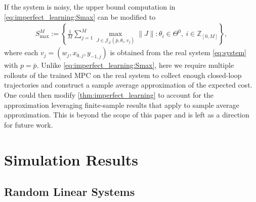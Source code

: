 \documentclass[journal,twoside,web,final]{ieeecolor}
\theoremstyle{definition}
\newcommand{\Z}{\mathbb{Z}}
\newcommand{\J}{\mathcal{J}}
\newcommand{\C}{\mathbb{C}}
\newcommand{\Cb}{{\bar{\mathcal{C}}}}
\begin{document}
If the system is noisy, the upper bound computation in \cref{eq:imperfect_learning:Smax} can be modified to
\begin{align*}
S_{\text{max}}^M := \left\{ \frac{1}{M} \sum_{j=1}^M \max_{J\in \J_\Cb(\bar{p},\theta_i,v_j)} \|J\| : \theta_i \in \Theta^0, ~ i\in\Z_{[0,M]}\right\},
\end{align*}
where each $v_j=(w_j,x_{0,j},y_{-1,j})$ is obtained from the real system \cref{eq:system} with $p=\bar{p}$. 
Unlike \cref{eq:imperfect_learning:Smax}, here we require multiple rollouts of the trained MPC on the real system to collect enough closed-loop trajectories and construct a sample average approximation of the expected cost. 
One could then modify \cref{thm:imperfect_learning} to account for the approximation leveraging finite-sample results that apply to sample average approximation. 
This is beyond the scope of this paper and is left as a direction for future work.


\section{Simulation Results}
\label{section:simulation_results}
\subsection{Random Linear Systems}\label{section:sim:random_linear}
\end{document}
